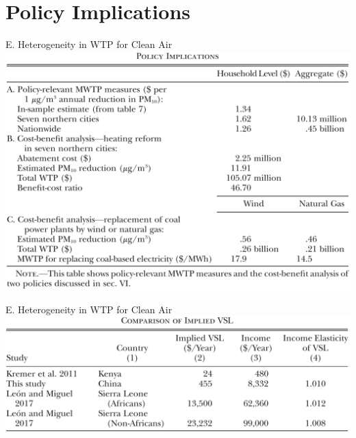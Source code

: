 \documentclass{beamer}
\begin{document}
\section{Policy Implications}
\begin{frame}[shrink]
	\transfade %
	\tableofcontents[sectionstyle=show/shaded,subsectionstyle=show/shaded/hide]
	\addtocounter{framenumber}{-1}
\end{frame}
\begin{frame}{E. Heterogeneity in WTP for Clean Air}
	\centering
	\includegraphics[scale=0.35]{table8.png}	
\end{frame}
\begin{frame}{E. Heterogeneity in WTP for Clean Air}
	\centering
	\includegraphics[scale=0.35]{table9.png}	
\end{frame}






\end{document}
